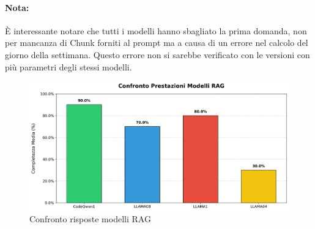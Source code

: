 \documentclass[12pt,a4paper,openright,twoside]{book}
\begin{document}
\paragraph{Nota:} È interessante notare che tutti i modelli hanno sbagliato la prima domanda,
non per mancanza di Chunk forniti al prompt ma a causa di un errore nel calcolo del giorno della settimana.
Questo errore non si sarebbe verificato con le versioni con più parametri degli stessi modelli.
\newpage
\begin{figure}[h]
    \centering
    \includegraphics[width=\textwidth]{figures/confronto_valutazioni_modelli.png}
    \caption{Confronto risposte modelli RAG}
    \label{fig:confronto-modelli}
\end{figure}
\end{document}
